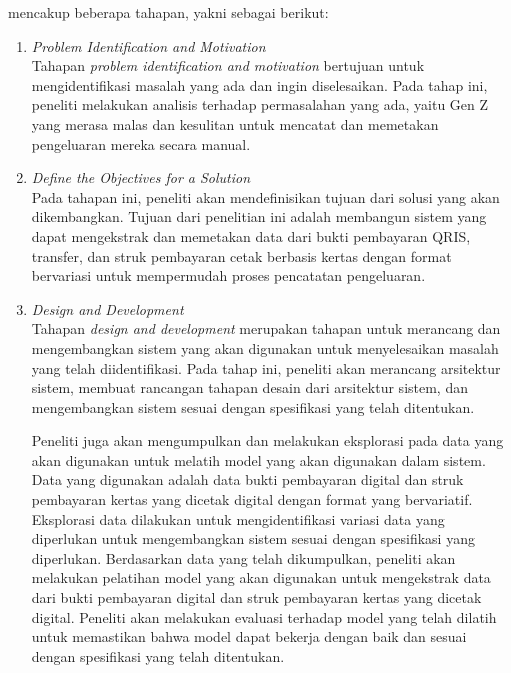 \dsrm{} mencakup beberapa tahapan, yakni sebagai berikut:
\begin{enumerate}
	\item \emph{Problem Identification and Motivation}~\\
	      Tahapan \emph{problem identification and motivation} bertujuan untuk mengidentifikasi masalah yang ada dan ingin diselesaikan. Pada tahap ini, peneliti melakukan analisis terhadap permasalahan yang ada, yaitu Gen Z yang merasa malas dan kesulitan untuk mencatat dan memetakan pengeluaran mereka secara manual.
	\item \emph{Define the Objectives for a Solution}~\\
	      Pada tahapan ini, peneliti akan mendefinisikan tujuan dari solusi yang akan dikembangkan. Tujuan dari penelitian ini adalah membangun sistem yang dapat mengekstrak dan memetakan data dari bukti pembayaran QRIS, transfer, dan struk pembayaran cetak berbasis kertas dengan format bervariasi untuk mempermudah proses pencatatan pengeluaran.
	\item \emph{Design and Development}~\\
	      Tahapan \emph{design and development} merupakan tahapan untuk merancang dan mengembangkan sistem yang akan digunakan untuk menyelesaikan masalah yang telah diidentifikasi. Pada tahap ini, peneliti akan merancang arsitektur sistem, membuat rancangan tahapan desain dari arsitektur sistem, dan mengembangkan sistem sesuai dengan spesifikasi yang telah ditentukan.
		  
		  Peneliti juga akan mengumpulkan dan melakukan eksplorasi pada data yang akan digunakan untuk melatih model \dl{} yang akan digunakan dalam sistem. Data yang digunakan adalah data bukti pembayaran digital dan struk pembayaran kertas yang dicetak digital dengan format yang bervariatif. Eksplorasi data dilakukan untuk mengidentifikasi variasi data yang diperlukan untuk mengembangkan sistem sesuai dengan spesifikasi yang diperlukan. Berdasarkan data yang telah dikumpulkan, peneliti akan melakukan pelatihan model \dl{} yang akan digunakan untuk mengekstrak data dari bukti pembayaran digital dan struk pembayaran kertas yang dicetak digital. Peneliti akan melakukan evaluasi terhadap model yang telah dilatih untuk memastikan bahwa model dapat bekerja dengan baik dan sesuai dengan spesifikasi yang telah ditentukan.


\end{enumerate}
